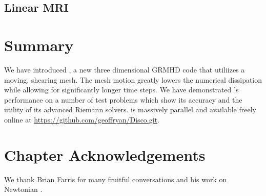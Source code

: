 \subsection{Linear MRI}


\section{Summary}

We have introduced \grdisco, a new three dimensional GRMHD code that utiliizes a moving, shearing mesh.  The mesh motion greatly lowers the numerical dissipation while allowing for significantly longer time steps.  We have demonstrated \grdisco's performance on a number of test problems which show its accuracy and the utility of its advanced Riemann solvers.  \grdisco is massively parallel and available freely online at \url{https://github.com/geoffryan/Disco.git}.

\section{Chapter Acknowledgements} 

We thank Brian Farris for many fruitful conversations and his work on Newtonian \disco.  

